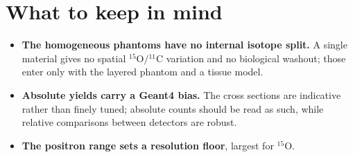 \documentclass[11pt]{article}
\newcommand{\Cl}[1]{{}^{#1}\mathrm{C}}
\newcommand{\Ox}[1]{{}^{#1}\mathrm{O}}
\begin{document}
\section{What to keep in mind}
\label{sec:caveats}

\begin{itemize}[nosep]
\item \textbf{The homogeneous phantoms have no internal isotope split.} A single
material gives no spatial $\Ox{15}/\Cl{11}$ variation and no biological washout;
those enter only with the layered phantom and a tissue model.
\item \textbf{Absolute yields carry a Geant4 bias.} The cross sections are
indicative rather than finely tuned; absolute counts should be read as such, while
relative comparisons between detectors are robust.
\item \textbf{The positron range sets a resolution floor}, largest for $\Ox{15}$.
\end{itemize}



\end{document}
